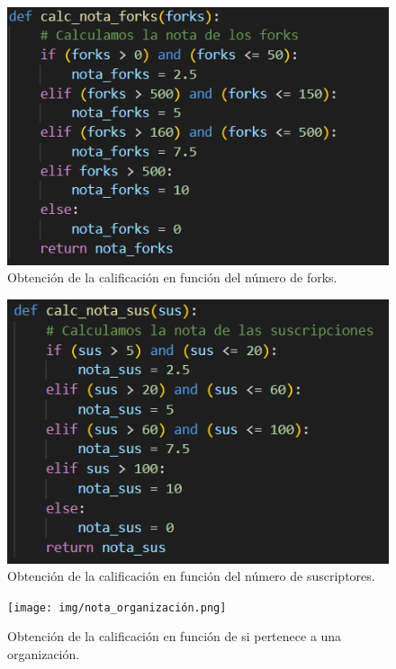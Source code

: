 \documentclass[a4paper, 12pt]{book}
\begin{document}
\begin{figure}
    \centering
    \includegraphics[width=1\textwidth, keepaspectratio]{img/nota_forks.png}
    \caption{Obtención de la calificación en función del número de forks.}\label{fig:nota_forks}
\end{figure}

\begin{figure}
    \centering
    \includegraphics[width=1\textwidth, keepaspectratio]{img/nota_suscriptores.png}
    \caption{Obtención de la calificación en función del número de suscriptores.}\label{fig:nota_suscriptores}
\end{figure}

\begin{figure}
    \centering
    \texttt{[image: img/nota\_organización.png]}
    \caption{Obtención de la calificación en función de si pertenece a una organización.}\label{fig:nota_organización}
\end{figure}
\end{document}
